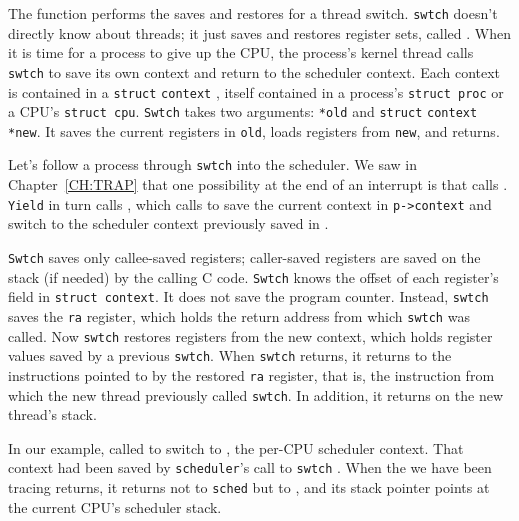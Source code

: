 The function
performs the saves and restores for a thread switch.
\lstinline{swtch}
doesn't directly know about threads; it just saves and
restores register sets, called 
.
When it is time for a process to give up the CPU,
the process's kernel thread calls
\lstinline{swtch}
to save its own context and return to the scheduler context.
Each context is contained in a
\lstinline{struct}
\lstinline{context}
,
itself contained in a process's
\lstinline{struct proc}
or a CPU's
\lstinline{struct cpu}.
\lstinline{Swtch}
takes two arguments:
\lstinline{*old}
and
\lstinline{struct}
\lstinline{context}
\lstinline{*new}.
It saves the current registers in
\lstinline{old},
loads registers from 
\lstinline{new},
and returns.

Let's follow a process through
\lstinline{swtch} 
into the scheduler.
We saw in Chapter~\ref{CH:TRAP}
that one possibility at the end of an interrupt is that 
calls 
.
\lstinline{Yield}
in turn calls
,
which calls
to save the current context in
\lstinline{p->context}
and switch to the scheduler context previously saved in 
.

\lstinline{Swtch}
saves only callee-saved registers;
caller-saved registers are saved on the stack (if needed) by the
calling C code.
\lstinline{Swtch} knows the offset of each
register's field in 
\lstinline{struct context}.
It does not save the program counter.
Instead,
\lstinline{swtch}
saves the
\lstinline{ra} register,
which holds the return address from which
\lstinline{swtch}
was called.
Now
\lstinline{swtch}
restores registers from the new context,
which holds register values saved by a previous
\lstinline{swtch}.
When 
\lstinline{swtch}
returns, it returns to the instructions pointed to
by the restored
\lstinline{ra}
register, that is,
the instruction from which the new thread previously
called \lstinline{swtch}.
In addition, it returns on the new thread's stack.

In our example, 
called
to switch to
,
the per-CPU scheduler context.
That context had been saved by 
\lstinline{scheduler}'s
call to
\lstinline{swtch}
.
When the
we have been tracing returns,
it returns not to
\lstinline{sched}
but to 
,
and its stack pointer points at the current CPU's
scheduler stack.

